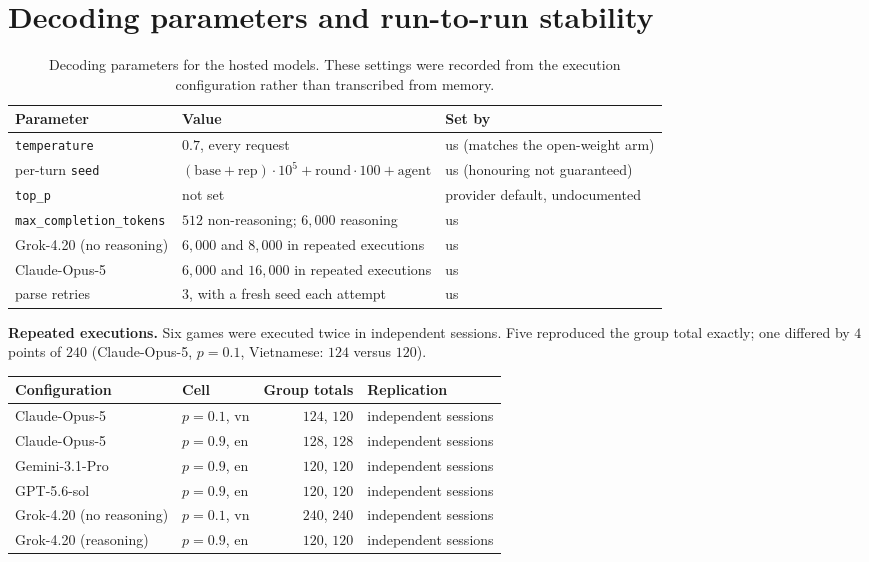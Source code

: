 \documentclass[11pt,a4paper]{article}
\begin{document}
\section{Decoding parameters and run-to-run stability}
\label{sec:decoding}

\begin{table}[h]
\centering
\caption{Decoding parameters for the hosted models. These settings were recorded
from the execution configuration rather than transcribed from memory.}
\label{tab:esm-decoding}
{\small
\setlength{\tabcolsep}{2pt}
\begin{tabular}{@{}p{.22\linewidth}p{.48\linewidth}p{.22\linewidth}@{}}
\toprule
Parameter & Value & Set by \\
\midrule
\texttt{temperature} & $0.7$, every request & us (matches the open-weight arm) \\
per-turn \texttt{seed} & $(\mathrm{base}+\mathrm{rep})\cdot10^5+\mathrm{round}\cdot100+\mathrm{agent}$ & us (honouring not guaranteed) \\
\texttt{top\_p} & not set & provider default, undocumented \\
{\scriptsize\texttt{max\_completion\_tokens}} & $512$ non-reasoning; $6{,}000$ reasoning & us \\
\quad Grok-4.20 (no reasoning) & $6{,}000$ and $8{,}000$ in repeated executions & us \\
\quad Claude-Opus-5 & $6{,}000$ and $16{,}000$ in repeated executions & us \\
parse retries & $3$, with a fresh seed each attempt & us \\
\bottomrule
\end{tabular}}
\end{table}

\noindent \textbf{Repeated executions.} Six games were executed twice in independent
sessions. Five reproduced the
group total exactly; one differed by $4$ points of $240$ (Claude-Opus-5, $p=0.1$,
Vietnamese: $124$ versus $120$).

\begin{center}
\begin{tabular}{@{}llrl@{}}
\toprule
Configuration & Cell & Group totals & Replication \\
\midrule
Claude-Opus-5            & $p{=}0.1$, vn & $124$, $120$ & independent sessions \\
Claude-Opus-5            & $p{=}0.9$, en & $128$, $128$ & independent sessions \\
Gemini-3.1-Pro           & $p{=}0.9$, en & $120$, $120$ & independent sessions \\
GPT-5.6-sol              & $p{=}0.9$, en & $120$, $120$ & independent sessions \\
Grok-4.20 (no reasoning) & $p{=}0.1$, vn & $240$, $240$ & independent sessions \\
Grok-4.20 (reasoning)    & $p{=}0.9$, en & $120$, $120$ & independent sessions \\
\bottomrule
\end{tabular}
\end{center}
\end{document}
